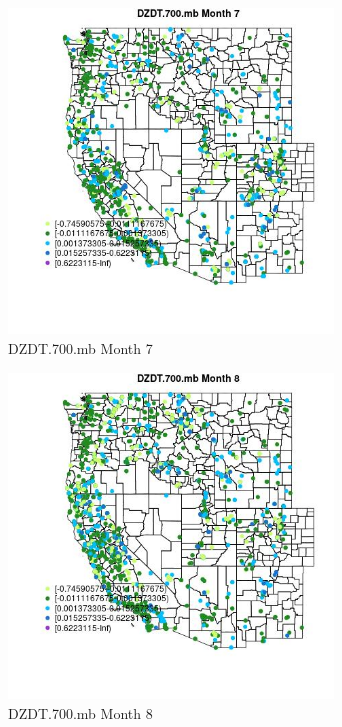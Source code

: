 \begin{figure} 
\centering  
\includegraphics[width=0.77\textwidth]{Code_Outputs/Report_ML_input_PM25_Step4_part_f_de_duplicated_aves_prioritize_24hr_obswNAs_MapObsMo7DZDT700mb.jpg} 
\caption{\label{fig:Report_ML_input_PM25_Step4_part_f_de_duplicated_aves_prioritize_24hr_obswNAsMapObsMo7DZDT700mb}DZDT.700.mb Month 7} 
\end{figure} 
 

\begin{figure} 
\centering  
\includegraphics[width=0.77\textwidth]{Code_Outputs/Report_ML_input_PM25_Step4_part_f_de_duplicated_aves_prioritize_24hr_obswNAs_MapObsMo8DZDT700mb.jpg} 
\caption{\label{fig:Report_ML_input_PM25_Step4_part_f_de_duplicated_aves_prioritize_24hr_obswNAsMapObsMo8DZDT700mb}DZDT.700.mb Month 8} 
\end{figure} 
 

